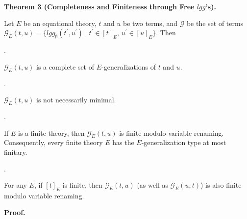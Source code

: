  
\par\medskip\noindent\textbf{Theorem 3 (Completeness and Finiteness through Free $\mathit{lgg}$’s).}\par
 
 
Let $E$ be an equational theory, $t$ and $u$ be two terms, and $\mathcal{G}$ be the set of terms $\mathcal{G}_{E}(t,u)=\{\mathit{lgg}_{\emptyset}(t^{\prime},u^{\prime})\mid t^{\prime}\in[t]_{E},\,u^{\prime}\in[u]_{E}\}$. Then\par
  
\par{}. 
 
$\mathcal{G}_{E}(t,u)$ is a complete set of $E$-generalizations of $t$ and $u$.\par
 
 
 
\par{}. 
 
$\mathcal{G}_{E}(t,u)$ is not necessarily minimal.\par
 
 
 
\par{}. 
 
If $E$ is a finite theory, then $\mathcal{G}_{E}(t,u)$ is finite modulo variable renaming. Consequently, every finite theory $E$ has the $E$-generalization type at most finitary.\par
 
 
 
\par{}. 
 
For any $E$, if $[t]_{E}$ is finite, then $\mathcal{G}_{E}(t,u)$ (as well as $\mathcal{G}_{E}(u,t)$) is also finite modulo variable renaming.\par
 
 
  
 
 
 
 
\par\medskip\noindent\textbf{Proof.}\par
 
